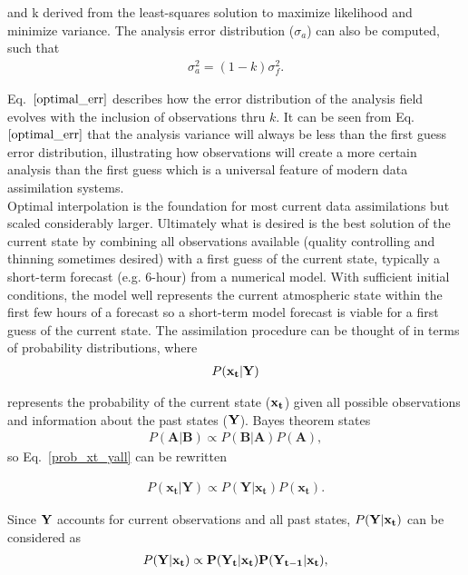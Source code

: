 \documentclass{ttuthes2007}
\newcommand{\tab}{\hspace*{2em}}  %
\begin{document}
and k derived from the least-squares solution to maximize likelihood and minimize variance. The analysis error distribution ($\sigma_a$) can also be computed, such that
\begin{align}\label{optimal_err}
	\sigma^2_a = (1-k)\sigma^2_f.
\end{align}

Eq.~$\ref{optimal_err}$ describes how the error distribution of the analysis field evolves with the inclusion of observations thru $k$. It can be seen from Eq.~$\ref{optimal_err}$ that the analysis variance will always be less than the first guess error distribution, illustrating how observations will create a more certain analysis than the first guess which is a universal feature of modern data assimilation systems.  \\

\tab Optimal interpolation is the foundation for most current data assimilations but scaled considerably larger. Ultimately what is desired is the best solution of the current state by combining all observations available (quality controlling and thinning sometimes desired) with a first guess of the current state, typically a short-term forecast (e.g. 6-hour) from a numerical model. With sufficient initial conditions, the model well represents the current atmospheric state within the first few hours of a forecast so a short-term model forecast is viable for a first guess of the current state. The assimilation procedure can be thought of in terms of probability distributions, where
\begin{align}\label{prob_xt_yall}
	P(\bf{x_t} | \bf{Y})
\end{align}

represents the probability of the current state ($\bf{x_t}$) given all possible observations and information about the past states ($\bf{Y}$). Bayes theorem \citep{BayesandPrice1763} states
\begin{align}
	P(\mathbf{A}|\mathbf{B}) \propto P(\mathbf{B}|\mathbf{A})P(\mathbf{A}),
\end{align}
so Eq.~\ref{prob_xt_yall} can be rewritten

\begin{align}\label{bayes}
	P(\mathbf{x_t} | \mathbf{Y}) \propto P(\mathbf{Y} | \mathbf{x_t}) P(\mathbf{x_t}).
\end{align}

Since $\bf{Y}$ accounts for current observations and all past states, $P(\bf{Y} | \bf{x_t})$ can be considered as  
\begin{align}\label{prob_yall_xt}
	P(\bf{Y} | \bf{x_t}) \propto P(\bf{Y_t} | \bf{x_t})P(\bf{Y_{t-1}} | \bf{x_t}),
\end{align}
\end{document}
